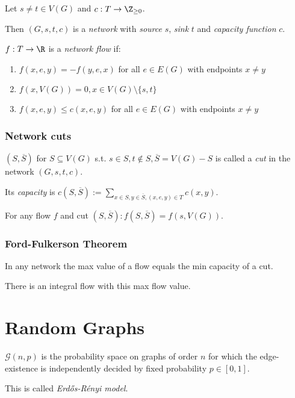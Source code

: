 Let $s \neq t \in V(G)$ and $c : T \to \Z_{\geq0}$.

Then $(G,s,t,c)$ is a \emph{network} with \emph{source} $s$, \emph{sink} $t$ and \emph{capacity function} $c$.

\spacing

$f : T \to \R$ is a \emph{network flow} if:

\begin{enumerate}
	\item $f(x,e,y) = -f(y,e,x)$ for all $e \in E(G)$ with endpoints $x \neq y$
	\item $f(x,V(G))=0, x \in V(G) \setminus \{s,t\}$
	\item $f(x,e,y) \leq c(x,e,y)$ for all $e \in E(G)$ with endpoints $x \neq y$
\end{enumerate}

\subsubsection*{Network cuts}

$(S,\overline S)$ for $S \subseteq V(G)$ s.t. $s \in S, t \notin S, \overline S = V(G)-S$ is called a \emph{cut} in the network $(G,s,t,c)$.

\spacing

Its \emph{capacity} is $c(S,\overline S) := \displaystyle\sum_{x \in S, y \in \overline S, (x,e,y) \in T} c(x,y)$.

\spacing

For any flow $f$ and cut $(S,\overline S) : f(S,\overline S) = f(s,V(G))$.

\subsubsection*{Ford-Fulkerson Theorem}

In any network the max value of a flow equals the min capacity of a cut.

There is an integral flow with this max flow value.

\section*{Random Graphs}

$\mathcal{G}(n,p)$ is the probability space on graphs of order $n$ for which the edge-existence is independently decided by fixed probability $p \in [0,1]$.

This is called \emph{Erd\H{o}s-R\'{e}nyi model}.

